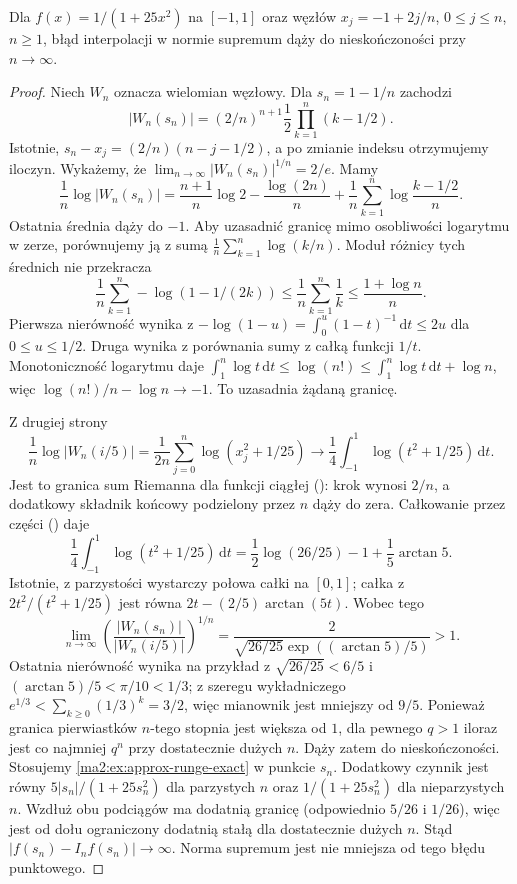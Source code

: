 \begin{twierdzenie}
\label{ma2:thm:approx-runge-divergence}
Dla $f(x)=1/(1+25x^2)$ na $[-1,1]$
oraz węzłów $x_j=-1+2j/n$, $0\le j\le n$, $n\ge1$,
błąd interpolacji w normie supremum
dąży do nieskończoności przy $n\to\infty$.
\end{twierdzenie}
\begin{proof}
Niech $W_n$ oznacza wielomian węzłowy.
Dla $s_n=1-1/n$ zachodzi
\[
 |W_n(s_n)|=(2/n)^{n+1}
                   \frac12\prod_{k=1}^n(k-1/2).
\]
Istotnie, $s_n-x_j=(2/n)(n-j-1/2)$,
a po zmianie indeksu otrzymujemy iloczyn.
Wykażemy, że
$\lim_{n\to\infty}|W_n(s_n)|^{1/n}=2/e$.
Mamy
\[
 \frac1n\log|W_n(s_n)|
 =\frac{n+1}{n}\log2-\frac{\log(2n)}n
       +\frac1n\sum_{k=1}^n
                    \log\frac{k-1/2}{n}.
\]
Ostatnia średnia dąży do $-1$.
Aby uzasadnić granicę mimo osobliwości
logarytmu w zerze, porównujemy ją z sumą
$\frac1n\sum_{k=1}^n\log(k/n)$.
Moduł różnicy tych średnich nie przekracza
\[
 \frac1n\sum_{k=1}^n
        -\log(1-1/(2k))
 \le\frac1n\sum_{k=1}^n\frac1k
 \le\frac{1+\log n}{n}.
\]
Pierwsza nierówność wynika z
$-\log(1-u)=\int_0^u(1-t)^{-1}\,\mathrm dt
\le2u$ dla $0\le u\le1/2$.
Druga wynika z porównania sumy z całką
funkcji $1/t$.
Monotoniczność logarytmu daje
$\int_1^n\log t\,\mathrm dt\le\log(n!)
\le\int_1^n\log t\,\mathrm dt+\log n$,
więc $\log(n!)/n-\log n\to-1$.
To uzasadnia żądaną granicę.

Z drugiej strony
\[
 \frac1n\log |W_n(i/5)|
 =\frac1{2n}\sum_{j=0}^n\log(x_j^2+1/25)
 \longrightarrow
 \frac14\int_{-1}^1\log(t^2+1/25)\,\mathrm dt .
\]
Jest to granica sum Riemanna dla funkcji ciągłej
(): krok wynosi $2/n$,
a dodatkowy składnik końcowy podzielony
przez $n$ dąży do zera.
Całkowanie przez części
() daje
\[
 \frac14\int_{-1}^1\log(t^2+1/25)\,\mathrm dt
 =\frac12\log(26/25)-1+\frac15\arctan5.
\]
Istotnie, z parzystości wystarczy połowa
całki na $[0,1]$; całka z
$2t^2/(t^2+1/25)$ jest równa
$2t-(2/5)\arctan(5t)$.
Wobec tego
\[
 \lim_{n\to\infty}
 \left(\frac{|W_n(s_n)|}{|W_n(i/5)|}\right)^{1/n}
 =\frac{2}{\sqrt{26/25}\exp((\arctan5)/5)}>1 .
\]
Ostatnia nierówność wynika na przykład
z $\sqrt{26/25}<6/5$ i
$(\arctan5)/5<\pi/10<1/3$;
z szeregu wykładniczego
$e^{1/3}<\sum_{k\ge0}(1/3)^k=3/2$,
więc mianownik jest mniejszy od $9/5$.
Ponieważ granica pierwiastków $n$-tego stopnia
jest większa od $1$, dla pewnego $q>1$
iloraz jest co najmniej $q^n$ przy dostatecznie
dużych $n$. Dąży zatem do nieskończoności.
Stosujemy \ref{ma2:ex:approx-runge-exact}
w punkcie $s_n$. Dodatkowy czynnik jest równy
$5|s_n|/(1+25s_n^2)$ dla parzystych $n$ oraz
$1/(1+25s_n^2)$ dla nieparzystych $n$.
Wzdłuż obu podciągów ma dodatnią granicę
(odpowiednio $5/26$ i $1/26$), więc
jest od dołu ograniczony dodatnią stałą
dla dostatecznie dużych $n$.
Stąd $|f(s_n)-I_nf(s_n)|\to\infty$.
Norma supremum jest nie mniejsza od
tego błędu punktowego.
\end{proof}

